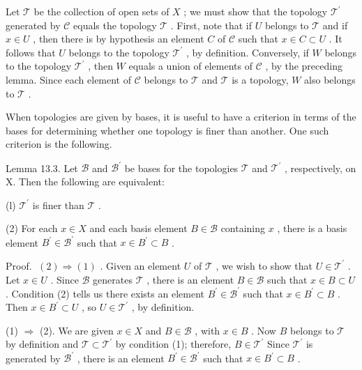 \documentclass[10pt]{article}
\begin{document}
Let \(\mathcal{T}\) be the collection of open sets of \(X\) ; we must show that the topology \({\mathcal{T}}^{\prime }\) generated by \(\mathcal{C}\) equals the topology \(\mathcal{T}\) . First, note that if \(U\) belongs to \(\mathcal{T}\) and if \(x \in  U\) , then there is by hypothesis an element \(C\) of \(\mathcal{C}\) such that \(x \in  C \subset  U\) . It follows that \(U\) belongs to the topology \({\mathcal{T}}^{\prime }\) , by definition. Conversely, if \(W\) belongs to the topology \({\mathcal{T}}^{\prime }\) , then \(W\) equals a union of elements of \(\mathcal{C}\) , by the preceding lemma. Since each element of \(\mathcal{C}\) belongs to \(\mathcal{T}\) and \(\mathcal{T}\) is a topology, \(W\) also belongs to \(\mathcal{T}\) .

When topologies are given by bases, it is useful to have a criterion in terms of the bases for determining whether one topology is finer than another. One such criterion is the following.

Lemma 13.3. Let \(\mathcal{B}\) and \({\mathcal{B}}^{\prime }\) be bases for the topologies \(\mathcal{T}\) and \({\mathcal{T}}^{\prime }\) , respectively, on X. Then the following are equivalent:

(l) \({\mathcal{T}}^{\prime }\) is finer than \(\mathcal{T}\) .

(2) For each \(x \in  X\) and each basis element \(B \in  \mathcal{B}\) containing \(x\) , there is a basis element \({B}^{\prime } \in  {\mathcal{B}}^{\prime }\) such that \(x \in  {B}^{\prime } \subset  B\) .

Proof. \(\;\left( 2\right)  \Rightarrow  \left( 1\right)\) . Given an element \(U\) of \(\mathcal{T}\) , we wish to show that \(U \in  {\mathcal{T}}^{\prime }\) . Let \(x \in  U\) . Since \(\mathcal{B}\) generates \(\mathcal{T}\) , there is an element \(B \in  \mathcal{B}\) such that \(x \in  B \subset  U\) . Condition (2) tells us there exists an element \({B}^{\prime } \in  {\mathcal{B}}^{\prime }\) such that \(x \in  {B}^{\prime } \subset  B\) . Then \(x \in  {B}^{\prime } \subset  U\) , so \(U \in  {\mathcal{T}}^{\prime }\) , by definition.

(1) \(\Rightarrow\) (2). We are given \(x \in  X\) and \(B \in  \mathcal{B}\) , with \(x \in  B\) . Now \(B\) belongs to \(\mathcal{T}\) by definition and \(\mathcal{T} \subset  {\mathcal{T}}^{\prime }\) by condition (1); therefore, \(B \in  {\mathcal{T}}^{\prime }\) Since \({\mathcal{T}}^{\prime }\) is generated by \({\mathcal{B}}^{\prime }\) , there is an element \({B}^{\prime } \in  {\mathcal{B}}^{\prime }\) such that \(x \in  {B}^{\prime } \subset  B\) .
\end{document}
